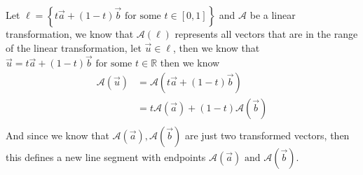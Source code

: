 \documentclass[notoc,notitlepage]{tufte-book}
\begin{document}
\begin{ex}
    Let $\ell = \left\{ t \vec{a} + \left( 1 - t \right) \vec{b} \text{ for some } t \in \left[ 0, 1 \right] \right\}$ and $\mathcal{A}$ be a linear transformation, we know that $\mathcal{A}\left(\ell\right)$ represents all vectors that are in the range of the linear transformation, let $\vec{u} \in \ell$,  then we know that $\vec{u} = t \vec{a} + \left( 1 - t \right)\vec{b} \text{ for some } t \in \mathbb{R}$ then we know 
    \begin{align*}
        \mathcal{A}\left(\vec{u}\right) &= \mathcal{A}\left(t \vec{a} + \left( 1 - t \right) \vec{b}\right)\\
                                        &= t\mathcal{A}\left(\vec{a}\right) + \left( 1 - t \right) \mathcal{A}\left(\vec{b}\right)\\
    \end{align*}
    And since we know that $\mathcal{A}\left(\vec{a}\right), \mathcal{A}\left(\vec{b}\right)$ are just two transformed vectors, then this defines a new line segment with endpoints $\mathcal{A}\left(\vec{a}\right) \text{  and  } \mathcal{A}\left(\vec{b}\right)$. 
\end{ex}
\end{document}
